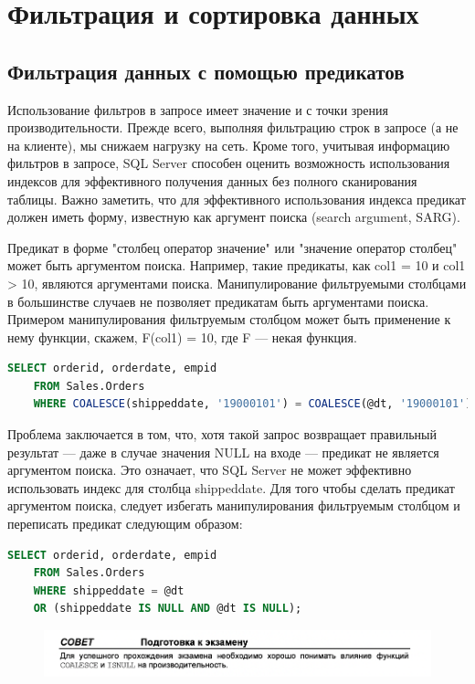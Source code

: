 \chapter{Фильтрация и сортировка данных }
\section{Фильтрация данных с помощью предикатов }


Использование фильтров в запросе имеет значение и с точки зрения производительности. Прежде всего, выполняя фильтрацию строк в запросе (а не на клиенте),
мы снижаем нагрузку на сеть. Кроме того, учитывая информацию фильтров в запросе, SQL Server способен оценить возможность использования индексов для
эффективного получения данных без полного сканирования таблицы. Важно заметить, что для эффективного использования индекса предикат должен иметь форму,
известную как аргумент поиска (search argument, SARG).

Предикат в форме "столбец оператор значение" или "значение оператор столбец"
может быть аргументом поиска. Например, такие предикаты, как col1 = 10 и
col1 > 10, являются аргументами поиска. Манипулирование фильтруемыми столбцами в большинстве случаев не позволяет предикатам быть аргументами поиска.
Примером манипулирования фильтруемым столбцом может быть применение
к нему функции, скажем, F(col1) = 10, где F — некая функция. 

\begin{lstlisting}[label=lst:funcReturn,  language=sql]
	SELECT orderid, orderdate, empid
	FROM Sales.Orders
	WHERE COALESCE(shippeddate, '19000101') = COALESCE(@dt, '19000101');
\end{lstlisting}

Проблема заключается в том, что, хотя такой запрос возвращает правильный результат — даже в случае значения NULL на входе — предикат не является аргументом поиска. Это означает, что SQL Server не может эффективно использовать индекс для столбца shippeddate. Для того чтобы сделать предикат аргументом поиска,
следует избегать манипулирования фильтруемым столбцом и переписать предикат
следующим образом: 

\begin{lstlisting}[label=lst:funcReturn,  language=sql]
	SELECT orderid, orderdate, empid
	FROM Sales.Orders
	WHERE shippeddate = @dt
	OR (shippeddate IS NULL AND @dt IS NULL);
\end{lstlisting}

\begin{figure}[h!]
	\begin{center}
		\includegraphics[width=1\textwidth]{img/advice3.png}
	\end{center}
	\captionsetup{justification=centering}
\end{figure}


